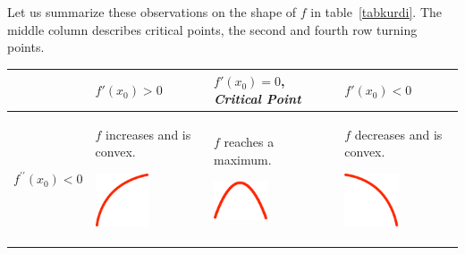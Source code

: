 Let us summarize these observations on the shape of $f$ in
table~\ref{tabkurdi}. The middle column describes critical points, the
second and fourth row turning points.
\begin{table}
{
\begin{center}
\begin{tabular}{p{17mm}|p{25mm}|p{25mm}|p{25mm}}
&$f'(x_0)>0$&
$f'(x_0)=0$, {\em Critical Point}&
$f'(x_0)<0$\\
\hline
$f^{\prime\prime}(x_0)<0$&
\begin{raggedright}
$f$ increases and is convex.
\centerline{\includegraphics[width=16mm]{pic/CTL.pdf}}
\end{raggedright}&%
\begin{raggedright}
$f$ reaches a maximum.
\centerline{\includegraphics[width=16mm]{pic/CMA.pdf}}
\end{raggedright}&%
\begin{raggedright}
$f$ decreases and is convex.
\centerline{\includegraphics[width=16mm]{pic/CTR.pdf}}
\end{raggedright}
\\


\end{tabular}
\end{center}}
\end{table}
